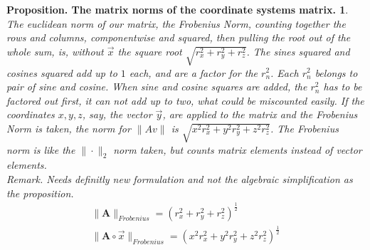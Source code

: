 \documentclass[a4paper]{article}
\begin{document}
\newtheorem{PropositionMatrixNorm}{Proposition. The matrix norms of the coordinate systems matrix.}
\begin{PropositionMatrixNorm}
\label{proposition_matrix_norm}
The euclidean norm of our matrix, the Frobenius Norm, counting together the rows and columns, componentwise and squared, then pulling the root out of the whole sum, is, without $\vec{x}$ the square root $\sqrt{r_{x}^{2}+r_{y}^{2}+r_{z}^{2}}$. The sines squared and cosines squared add up to $1$ each, and are a factor for the $r_{n}^{2}$. Each $r_{n}^{2}$ belongs to pair of sine and cosine. When sine and cosine squares are added, the $r_{n}^{2}$ has to be factored out first, it can not add up to two, what could be miscounted easily. If the coordinates $x,y,z$, say, the vector $\vec{y}$, are applied to the matrix and the Frobenius Norm is taken, the norm for $\|Av\|$ is $\sqrt{x^{2}r_{x}^{2}+y^{2}r_{y}^{2}+z^{2}r_{z}^{2}}$. The Frobenius norm is like the $\|\cdot\|_{2}$ norm taken, but counts matrix elements instead of vector elements.\\

Remark. Needs definitly new formulation and not the algebraic simplification as the proposition.\\

\begin{displaymath}
\begin{align}
\|\boldsymbol{A}\|_{Frobenius} = (r_{x}^{2}+r_{y}^{2}+r_{z}^{2})^{\frac{1}{2}}\\
\|\boldsymbol{A}\circ\vec{x}\|_{Frobenius} = (x^{2}r_{x}^{2}+y^{2}r_{y}^{2}+z^{2}r_{z}^{2})^{\frac{1}{2}}
\end{align}
\end{displaymath}
\end{PropositionMatrixNorm}
\end{document}
